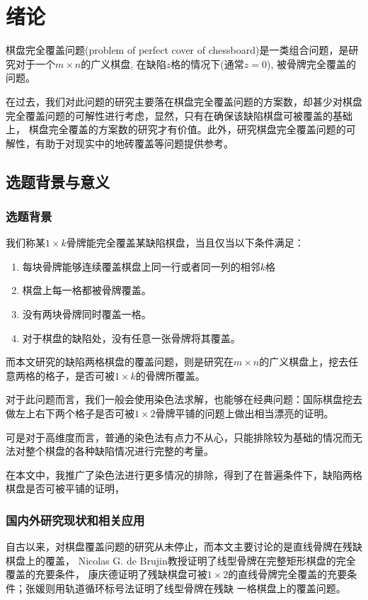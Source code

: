 \chapter{绪论}
棋盘完全覆盖问题(problem of perfect cover of chessboard)是一类组合问题，是研究对于一个$m \times n$的广义棋盘, 在缺陷$z$格的情况下(通常$z=0$), 被骨牌完全覆盖的问题。

在过去，我们对此问题的研究主要落在棋盘完全覆盖问题的方案数，却甚少对棋盘完全覆盖问题的可解性进行考虑，显然，只有在确保该缺陷棋盘可被覆盖的基础上，
棋盘完全覆盖的方案数的研究才有价值。此外，研究棋盘完全覆盖问题的可解性，有助于对现实中的地砖覆盖等问题提供参考。

\section{选题背景与意义}

\subsection{选题背景}

我们称某$1 \times k$骨牌能完全覆盖某缺陷棋盘，当且仅当以下条件满足：
\begin{enumerate}
    \item 每块骨牌能够连续覆盖棋盘上同一行或者同一列的相邻$k$格
    \item 棋盘上每一格都被骨牌覆盖。
    \item 没有两块骨牌同时覆盖一格。
    \item 对于棋盘的缺陷处，没有任意一张骨牌将其覆盖。
\end{enumerate}

而本文研究的缺陷两格棋盘的覆盖问题，则是研究在$m \times n$的广义棋盘上，挖去任意两格的格子，是否可被$1 \times k$的骨牌所覆盖。

对于此问题而言，我们一般会使用染色法求解，也能够在经典问题：国际棋盘挖去做左上右下两个格子是否可被$1 \times 2$骨牌平铺的问题上做出相当漂亮的证明。

可是对于高维度而言，普通的染色法有点力不从心，只能排除较为基础的情况而无法对整个棋盘的各种缺陷情况进行完整的考量。

在本文中，我推广了染色法进行更多情况的排除，得到了在普遍条件下，缺陷两格棋盘是否可被平铺的证明，

\subsection{国内外研究现状和相关应用}
\label{sec:related_work}
自古以来，对棋盘覆盖问题的研究从未停止，而本文主要讨论的是直线骨牌在残缺棋盘上的覆盖，
Nicolas G. de Brujin教授证明了线型骨牌在完整矩形棋盘的完全覆盖的充要条件\cite{fengBasicTheorem}，
康庆德\cite{ZRZZ199205013}证明了残缺棋盘可被$1 \times 2$的直线骨牌完全覆盖的充要条件；张媛\cite{zhangOneStain}则用轨道循环标号法证明了线型骨牌在残缺
一格棋盘上的覆盖问题。

